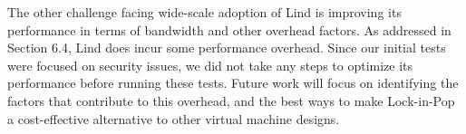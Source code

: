 The other challenge facing wide-scale adoption of Lind is improving its
performance in terms of bandwidth and other overhead factors. As addressed in
Section 6.4, Lind does incur some performance overhead. Since our initial tests
were focused on security issues, we did not take any steps to optimize
its performance before running these tests. Future work will focus on identifying
the factors that contribute to this overhead, and the best ways to make Lock-in-Pop
a cost-effective alternative to other virtual machine designs.

%

